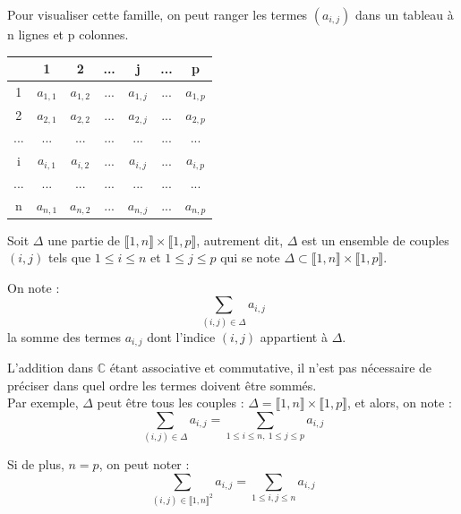 \documentclass[a4paper,11pt]{article}
\newcommand{\C}{\mathbb{C}}
\newcommand{\intN}[2]{\llbracket #1, #2 \rrbracket}
\newcommand{\encadLEQ}[3]{#1 \leq #2 \leq #3}
\begin{document}
Pour visualiser cette famille, on peut ranger les termes $(a_{i, j})$ dans un tableau à n lignes et p colonnes.

\begin{center}
	\begin{tabular}{|c|cccccc|}
		\hline
		& 1 & 2 & ... & j & ... & p \\
		\hline
		1 & $a_{1, 1}$ & $a_{1, 2}$ & ... & $a_{1, j}$ & ... & $a_{1, p}$ \\
		2 & $a_{2, 1}$ & $a_{2, 2}$ & ... & $a_{2, j}$ & ... & $a_{2, p}$ \\
		... & ... & ... & ... & ... & ... & ... \\
		i & $a_{i, 1}$ & $a_{i, 2}$ & ... & $a_{i, j}$ & ... & $a_{i, p}$ \\
		... & ... & ... & ... & ... & ... & ... \\
		n & $a_{n, 1}$ & $a_{n, 2}$ & ... & $a_{n, j}$ & ... & $a_{n, p}$ \\
		\hline
		
	\end{tabular}
\end{center}

Soit $\Delta$ une partie de $\intN{1}{n} \times \intN{1}{p}$, autrement dit, $\Delta$ est un ensemble de couples $(i, j)$ tels que $\encadLEQ{1}{i}{n}$ et $\encadLEQ{1}{j}{p}$ qui se note $\Delta \subset \intN{1}{n} \times \intN{1}{p}$.

On note :
$$\sum_{(i,j)\in\Delta}a_{i, j}$$
la somme des termes $a_{i, j}$ dont l'indice $(i, j)$ appartient à $\Delta$.

L'addition dans $\C$ étant associative et commutative, il n'est pas nécessaire de préciser dans quel ordre les termes doivent être sommés. \\
Par exemple, $\Delta$ peut être tous les couples : $\Delta = \intN{1}{n} \times \intN{1}{p}$, et alors, on note :
$$\sum_{(i, j)\in\Delta}a_{i, j} = \sum_{\encadLEQ{1}{i}{n}, \: \encadLEQ{1}{j}{p}}a_{i, j}$$

Si de plus, $n = p$, on peut noter :
$$\sum_{(i, j)\in\intN{1}{n}^2}a_{i, j} = \sum_{\encadLEQ{1}{i, j}{n}}a_{i, j}$$
\end{document}
